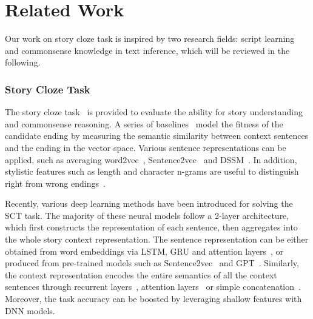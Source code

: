 \section{Related Work}
\label{sec:related}

Our work on story cloze task is inspired by two research fields: script learning and commonsense knowledge in text inference, which will be reviewed in the following.

\subsubsection*{Story Cloze Task}
The story cloze task~\cite{mostafazadeh2016corpus} is provided 
to evaluate the ability for story understanding and 
commonsense reasoning. A series of baselines~\cite{mihaylov2017story,mostafazadeh2016story}
model the fitness of the candidate ending
by measuring the semantic similarity between context sentences 
and the ending in the vector space.
Various sentence representations can be applied,
such as averaging word2vec~\cite{mikolov2013distributed},
Sentence2vec~\cite{kiros2015skip} and DSSM~\cite{huang2013learning}.
In addition, stylistic features such as length and
character n-grams are useful to distinguish
right from wrong endings~\cite{schwartz2017story}. 

Recently, various deep learning methods have been introduced for
solving the SCT task.
The majority of these neural models follow a 2-layer architecture,
which first constructs the representation of each sentence,
then aggregates into the whole story context representation.
The sentence representation can be either obtained from word embeddings
via LSTM, GRU and attention layers~\cite{wang2017conditional,zhou2019story},
or produced from pre-trained models such as
Sentence2vec~\cite{roemmele2017rnn,srinivasan2018simple} and
GPT~\cite{radford2018improving,chen2018incorporating}.
Similarly, the context representation encodes the entire semantics
of all the context sentences through recurrent layers~\cite{cai2017pay},
attention layers~\cite{li2018multi}
or simple concatenation~\cite{bugert2017lsdsem}.
Moreover, the task accuracy can be boosted by leveraging shallow features with DNN models.


